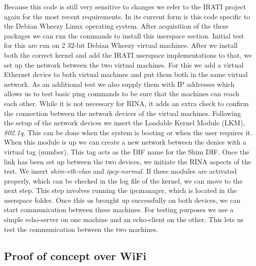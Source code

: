Because this code is still very sensitive to changes we refer to the IRATI project again for the most recent requirements. In its current form is this code specific to the Debian Wheezy Linux operating system. After acquisition of the these packages we can run the commands to install this userspace section. 
\npar
Initial test for this are run on 2 32-bit Debian Wheezy virtual machines. After we install both the correct kernel and add the IRATI userspace implementations to that, we set up the network between the two virtual machines. For this we add a virtual Ethernet device to both virtual machines and put them both in the same virtual network. As an additional test we also supply them with IP addresses which allows us to test basic ping commands to be sure that the machines can reach each other. While it is not necessary for RINA, it adds an extra check to confirm the connection between the network devices of the virtual machines. 
\npar
Following the setup of the network devices we insert the Loadable Kernel Module (LKM), \emph{802.1q}. This can be done when the system is booting or when the user requires it. When this module is up we can create a new network between the denies with a virtual tag (number). This tag acts as the DIF name for the Shim DIF. Once the link has been set up between the two devices, we initiate the RINA aspects of the test. We insert \emph{shim-eth-vlan} and \emph{ipcp-normal}. If these modules are activated properly, which can be checked in the log file of the kernel, we can move to the next step. This step involves running the ipcmanager, which is located in the userspace folder. Once this us brought up successfully on both devices, we can start communication between these machines. For testing purposes we use a simple echo-server on one machine and an echo-client on the other. This lets us test the communication between the two machines. 

\subsection{Proof of concept over WiFi}


